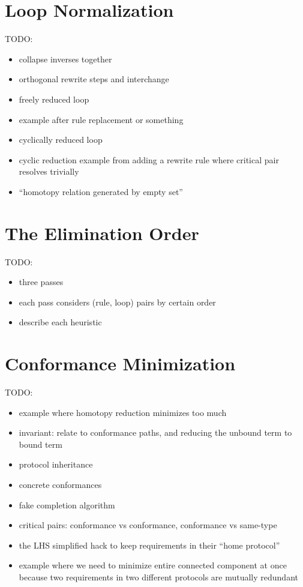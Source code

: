 \documentclass[../generics]{subfiles}
\begin{document}
\section{Loop Normalization}

\cite{homotopyreduction}

\ifWIP
TODO:
\begin{itemize}
\item collapse inverses together
\item orthogonal rewrite steps and interchange
\item freely reduced loop
\item example after rule replacement or something
\item cyclically reduced loop
\item cyclic reduction example from adding a rewrite rule where critical pair resolves trivially
\item ``homotopy relation generated by empty set''
\end{itemize}
\fi

\section{The Elimination Order}\label{elimination order}

\ifWIP
TODO:
\begin{itemize}
\item three passes
\item each pass considers (rule, loop) pairs by certain order
\item describe each heuristic
\end{itemize}
\fi

\section{Conformance Minimization}\label{minimal conformances}


\ifWIP
TODO:
\begin{itemize}
\item example where homotopy reduction minimizes too much
\item invariant: relate to conformance paths, and reducing the unbound term to bound term
\item protocol inheritance
\item concrete conformances
\item fake completion algorithm
\item critical pairs: conformance vs conformance, conformance vs same-type
\item the LHS simplified hack to keep requirements in their ``home protocol''
\item example where we need to minimize entire connected component at once because two requirements in two different protocols are mutually redundant
\end{itemize}
\fi
\end{document}
